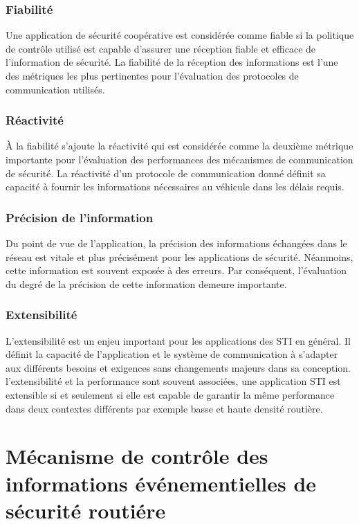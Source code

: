 \subsubsection{Fiabilité}
Une application de sécurité coopérative est considérée comme fiable si la politique de contrôle utilisé est capable d'assurer une réception fiable et efficace de l'information de sécurité. La fiabilité de la réception des informations est l'une des métriques les plus pertinentes pour l'évaluation des protocoles de communication utilisés.

\subsubsection{Réactivit\'e}
À la fiabilité s'ajoute la réactivité qui est consid\'erée comme la deuxième métrique importante pour l'évaluation des performances des mécanismes de communication de sécurité. La réactivité d'un protocole de communication donné définit sa capacité à fournir les informations nécessaires au véhicule dans les délais requis.

\subsubsection{Précision de l'information}
Du point de vue de l'application, la précision des informations échangées dans le réseau est vitale et plus précisément pour les applications de sécurité. Néanmoins, cette information est souvent exposée à des erreurs. Par conséquent, l'évaluation du degré de la précision de cette information demeure importante.

\subsubsection{Extensibilité}
L'extensibilité est un enjeu important pour les applications des STI en général. Il définit la capacité de l'application et le système de communication à s'adapter aux différents besoins et exigences sans changements majeurs dans sa conception. l'extensibilité et la performance sont souvent associées, une application STI est extensible si et seulement si elle est capable de garantir la même performance dans deux contextes différents par exemple basse et haute densité routière.


\section{Mécanisme de contrôle des informations événementielles de sécurité routiére\label{cont1}}


